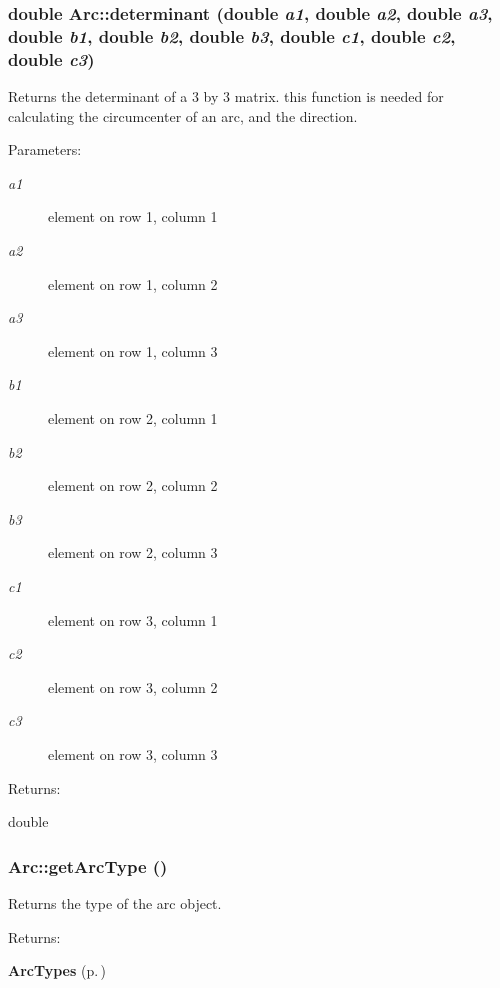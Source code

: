 \subsubsection{\setlength{\rightskip}{0pt plus 5cm}double Arc::determinant (double {\em a1}, double {\em a2}, double {\em a3}, double {\em b1}, double {\em b2}, double {\em b3}, double {\em c1}, double {\em c2}, double {\em c3})\hspace{0.3cm}{\tt  [protected]}}\label{classArc_b4}


Returns the determinant of a 3 by 3 matrix. this function is needed for calculating the circumcenter of an arc, and the direction. \begin{Desc}
\item[Parameters: ]\par
\begin{description}
\item[{\em 
a1}]element on row 1, column 1 \item[{\em 
a2}]element on row 1, column 2 \item[{\em 
a3}]element on row 1, column 3 \item[{\em 
b1}]element on row 2, column 1 \item[{\em 
b2}]element on row 2, column 2 \item[{\em 
b3}]element on row 2, column 3 \item[{\em 
c1}]element on row 3, column 1 \item[{\em 
c2}]element on row 3, column 2 \item[{\em 
c3}]element on row 3, column 3 \end{description}
\end{Desc}
\begin{Desc}
\item[Returns: ]\par
double \end{Desc}
\subsubsection{ Arc::get\-Arc\-Type ()\hspace{0.3cm}{\tt  [inline]}}\label{classArc_a4}


Returns the type of the arc object. \begin{Desc}
\item[Returns: ]\par
{\bf Arc\-Types} {\rm (p.\,\pageref{classArc_s5})} \end{Desc}
